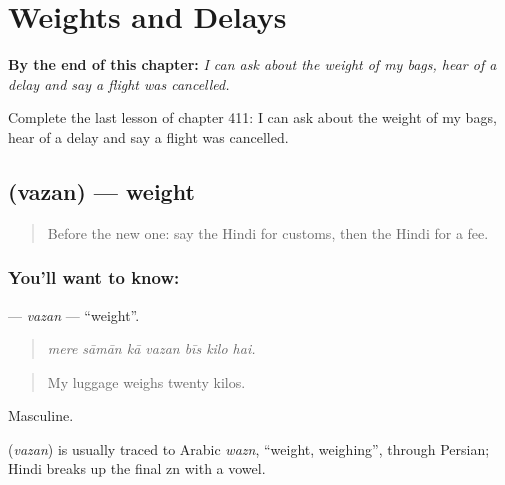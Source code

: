 
\chapter{Weights and Delays}
\label{ch:hi-weights-and-delays}

\begin{chapteropening}
\textbf{By the end of this chapter:} \emph{I can ask about the weight of my bags, hear of a delay and say a flight was cancelled.}

Complete the last lesson of chapter 411: I can ask about the weight of my bags, hear of a delay and say a flight was cancelled.
\end{chapteropening}

\section[\texorpdfstring{\hi{वज़न} (vazan)}{वज़न (vazan)}]{ (vazan) — weight}

\label{lesson:HI-C411-vazan}



\begin{quote}
Before the new one: say the Hindi for customs, then the Hindi for a fee.
\end{quote}

\subsection*{You'll want to know: }
\textbf{} — \emph{vazan} — \textquotedblleft{}weight\textquotedblright{}.

\begin{quote}
      
\end{quote}

\begin{quote}
\emph{mere sāmān kā vazan bīs kilo hai.}
\end{quote}

\begin{quote}
My luggage weighs twenty kilos.
\end{quote}

Masculine.

\begin{cousinweb}
\textbf{} (\emph{vazan}) is usually traced to Arabic \emph{wazn}, \textquotedblleft{}weight, weighing\textquotedblright{}, through Persian; Hindi breaks up the final zn with a vowel.
\end{cousinweb}

